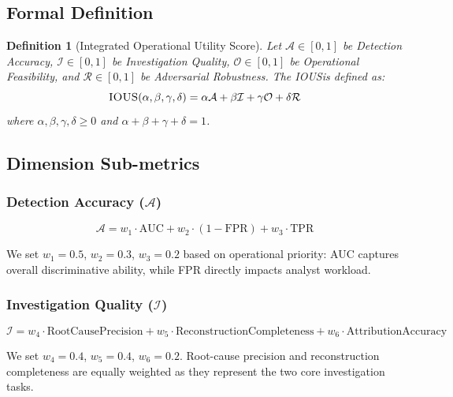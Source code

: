 \documentclass[11pt,a4paper]{article}
\newcommand{\ious}{\textsc{IOUS}}
\newtheorem{definition}{Definition}
\begin{document}
\subsection{Formal Definition}

\begin{definition}[Integrated Operational Utility Score]
Let $\mathcal{A} \in [0, 1]$ be Detection Accuracy, $\mathcal{I} \in [0, 1]$ be Investigation Quality, $\mathcal{O} \in [0, 1]$ be Operational Feasibility, and $\mathcal{R} \in [0, 1]$ be Adversarial Robustness. The \ious is defined as:
\begin{equation}
\textsc{IOUS}(\alpha, \beta, \gamma, \delta) = \alpha \mathcal{A} + \beta \mathcal{I} + \gamma \mathcal{O} + \delta \mathcal{R}
\end{equation}
where $\alpha, \beta, \gamma, \delta \geq 0$ and $\alpha + \beta + \gamma + \delta = 1$.
\end{definition}

\subsection{Dimension Sub-metrics}

\subsubsection{Detection Accuracy ($\mathcal{A}$)}

\begin{equation}
\mathcal{A} = w_1 \cdot \text{AUC} + w_2 \cdot (1 - \text{FPR}) + w_3 \cdot \text{TPR}
\end{equation}

We set $w_1 = 0.5$, $w_2 = 0.3$, $w_3 = 0.2$ based on operational priority: AUC captures overall discriminative ability, while FPR directly impacts analyst workload.

\subsubsection{Investigation Quality ($\mathcal{I}$)}

\begin{equation}
\mathcal{I} = w_4 \cdot \text{RootCausePrecision} + w_5 \cdot \text{ReconstructionCompleteness} + w_6 \cdot \text{AttributionAccuracy}
\end{equation}

We set $w_4 = 0.4$, $w_5 = 0.4$, $w_6 = 0.2$. Root-cause precision and reconstruction completeness are equally weighted as they represent the two core investigation tasks.
\end{document}
